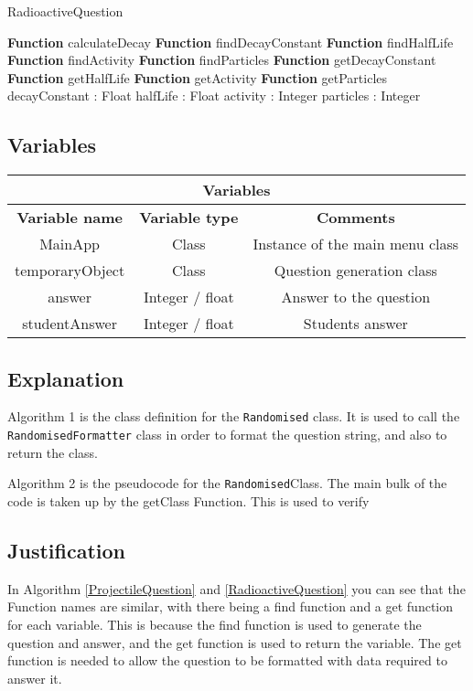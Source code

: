 \begin{algorithm}[H]\label{RadioactiveQuestion}
	\caption{RadioactiveQuestion}
	\begin{algorithmic}[1]
		\public
		\State \textbf{Function} calculateDecay
		\State \textbf{Function} findDecayConstant
		\State \textbf{Function} findHalfLife
		\State \textbf{Function} findActivity
		\State \textbf{Function} findParticles
		\State \textbf{Function} getDecayConstant
		\State \textbf{Function} getHalfLife
		\State \textbf{Function} getActivity
		\State \textbf{Function} getParticles
		\endpublic
		\private
		\State decayConstant : Float
		\State halfLife : Float
		\State activity : Integer
		\State particles : Integer
		\endprivate
		\EndProcedure
	\end{algorithmic}
\end{algorithm}
\clearpage
\subsection{Variables}
\begin{center}
	\begin{tabular}{|c|c|c|}
		\hline
		\multicolumn{3}{|c|}{\textbf{Variables}}\\
			\hline
			\textbf{Variable name} & \textbf{Variable type} & \textbf{Comments}\\
			\hline
			MainApp & Class & Instance of the main menu class \\
			\hline
			temporaryObject & Class & Question generation class
			 \\
			\hline
			answer & Integer / float & Answer to the question \\
			\hline
			studentAnswer & Integer / float & Students answer \\
			\hline
		\end{tabular}
	\end{center}
\subsection {Explanation}
Algorithm 1 is the class definition for the \texttt{Randomised} class. It is used to call the \texttt{RandomisedFormatter} class in order to format the question string, and also to return the class.

Algorithm 2 is the pseudocode for the \texttt{Randomised}Class. The main bulk of the code is taken up by the getClass Function. This is used to verify
\subsection{Justification}
In Algorithm \ref{ProjectileQuestion} and \ref{RadioactiveQuestion} you can see that the Function names are similar, with there being a find function and a get function for each variable. This is because the find function is used to generate the question and answer, and the get function is used to return the variable. The get function is needed to allow the question to be formatted with data required to answer it.

